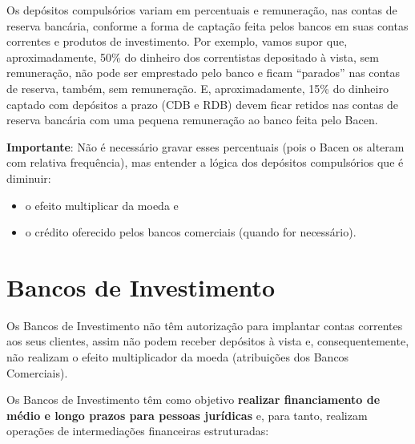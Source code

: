 \documentclass{article}\usepackage[]{graphicx}\usepackage[]{xcolor}
\begin{document}
Os depósitos compulsórios variam em percentuais e remuneração, nas contas de reserva bancária, conforme a forma de 
captação feita pelos bancos em suas contas correntes e produtos de investimento. Por exemplo, vamos supor que, 
aproximadamente, 50\% do dinheiro dos correntistas depositado à vista, sem remuneração, não pode ser emprestado pelo 
banco e ficam \enquote{parados} nas contas de reserva, também, sem remuneração. E, aproximadamente, 15\% do dinheiro 
captado com depósitos a prazo (CDB e RDB) devem ficar retidos nas contas de reserva bancária com uma pequena remuneração 
ao banco feita pelo Bacen.\par

\textbf{Importante}: Não é necessário gravar esses percentuais (pois o Bacen os alteram com relativa frequência), 
mas entender a lógica dos depósitos compulsórios que é diminuir:

\begin{itemize}

  \item o efeito multiplicar da moeda e
  
  \item o crédito oferecido pelos bancos comerciais (quando for necessário).

\end{itemize}

\section*{Bancos de Investimento}

Os Bancos de Investimento não têm autorização para implantar contas correntes aos seus clientes, 
assim não podem receber depósitos à vista e, consequentemente, não realizam o efeito multiplicador da moeda 
(atribuições dos Bancos Comerciais).\par

Os Bancos de Investimento têm como objetivo \textbf{realizar financiamento de médio e longo prazos para pessoas
jurídicas} e, para tanto, realizam operações de intermediações financeiras estruturadas:
\end{document}
